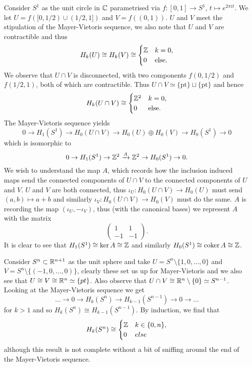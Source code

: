 \begin{example}
	 Consider $S^1$ as the unit circle in $\mathbb{C}$ parametrised via $f: [0, 1] \to S^1$, $t \mapsto e^{2\pi i t}$. We let $U = f([0,1/2) \cup (1/2, 1])$ and $V = f((0,1))$. $U$ and $V$ meet the stipulation of the Mayer-Vietoris sequence, we also note that $U$ and $V$ are contractible and thus
	\[
		H_k(U) \cong H_k(V) \cong \begin{cases}
			\mathbb{Z} & k=0,         \\
			0  & \text{else}.
		\end{cases}
	\]
	We observe that $U \cap V$ is disconnected, with two components $f(0,1/2)$ and $f(1/2,1)$, both of which are contractible. Thus $U \cap V \simeq \{\text{pt}\} \sqcup \{\text{pt}\}$ and hence
	\[
		H_k(U \cap V) \cong \begin{cases}
			\mathbb{Z}^2 & k=0,         \\
			0    & \text{else}.
		\end{cases}
	\]
	The Mayer-Vietoris sequence yields
	\[0 \to H_1(S^1) \to H_0(U \cap V) \to H_0(U) \oplus H_0(V) \to H_0(S^1) \to 0\]
	which is isomorphic to
	\[0 \to H_1(S^1) \to \mathbb{Z}^2 \xrightarrow{A} \mathbb{Z}^2 \to H_0(S^1) \to 0.\]
	We wish to understand the map $A$, which records how the inclusion induced maps send the connected components of $U \cap V$ to the connected components of $U$ and $V$. $U$ and $V$ are both connected, thus $\iota_U: H_0(U \cap V) \to H_0(U)$ must send $(a,b) \mapsto a + b$ and similarly $\iota_V: H_0(U \cap V) \to H_0(V)$ must do the same. $A$ is recording the map $(\iota_U, -\iota_V)$, thus (with the canonical bases) we represent $A$ with the matrix
	\[\begin{pmatrix} 1 & 1 \\ -1 & -1 \end{pmatrix}.\] It is clear to see that $H_1(S^1) \cong \ker A \cong \mathbb{Z}$ and similarly $H_0(S^1) \cong \operatorname{coker} A \cong \mathbb{Z}$.
	\end{example}

\begin{example}
	\item Consider $S^n \subset \mathbb{R}^{n+1}$ as the unit sphere and take $U = S^n \setminus \{1,0,\ldots,0\}$ and $V = S^n \setminus \{(-1,0,\ldots,0)\}$, clearly these set us up for Mayer-Vietoris and we also see that $U \cong V \cong \mathbb{R}^n \simeq \{pt\}$. Also observe that $U \cap V \cong \mathbb{R}^n \setminus \{0\} \simeq S^{n-1}$. Looking at the Mayer-Vietoris sequence we get
	\[\ldots \to 0 \to H_k(S^n) \to H_{k-1}(S^{n-1}) \to 0 \to \ldots\]
	for $k > 1$ and so $H_k(S^n) \cong H_{k-1}(S^{n-1})$. By induction, we find that
	\[H_k(S^n) \cong \begin{cases}
			\mathbb{Z} & k \in \{0, n\}, \\
			0  & else
		\end{cases}\]
	although this result is not complete without a bit of sniffing around the end of the Mayer-Vietoris sequence.
\end{example}
